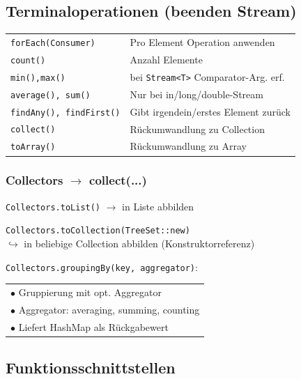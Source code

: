 {\subsection{Terminaloperationen (beenden Stream)}
    \begin{tabular}{l l}
        \verb|forEach(Consumer)     | & Pro Element Operation anwenden \\
        \verb|count()               | & Anzahl Elemente \\
        \verb|min(),max()           | & bei \verb|Stream<T>| Comparator-Arg. erf. \\
        \verb|average(), sum()      | & Nur bei in/long/double-Stream \\
        \verb|findAny(), findFirst()| & Gibt irgendein/erstes Element zurück \\
        \verb|collect()|              & Rückumwandlung zu Collection \\
        \verb|toArray()|              & Rückumwandlung zu Array \\
    \end{tabular}
    \vspace{-0.3cm}

    \subsubsection{Collectors $\rightarrow$ collect(...)}
        \verb|Collectors.toList()| $\rightarrow$ in Liste abbilden

        \verb|Collectors.toCollection(TreeSet::new)| \\
        $\hookrightarrow$ in beliebige Collection abbilden (Konstruktorreferenz)

        \verb|Collectors.groupingBy(key, aggregator)|:

        \begin{tabular}{l}
            $\bullet$ Gruppierung mit opt. Aggregator\\
            $\bullet$ Aggregator: averaging, summing, counting\\
            $\bullet$ Liefert HashMap als Rückgabewert\\
        \end{tabular}
        \vspace{-0.3cm}

\subsection{Funktionsschnittstellen}
}

